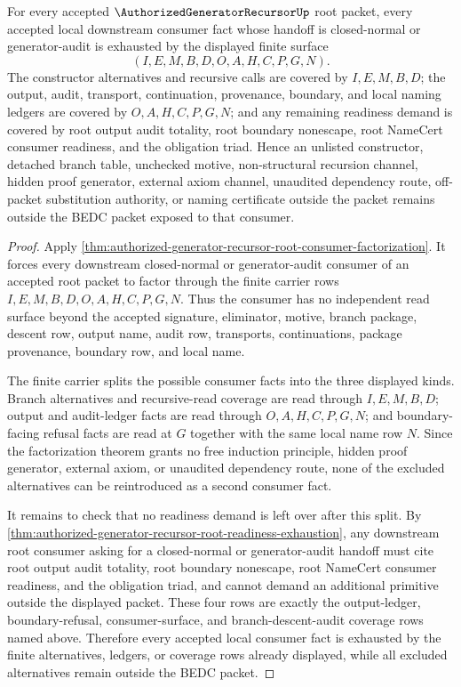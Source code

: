 \begin{theorem}
\label{thm:authorized-generator-recursor-root-consumer-fact-downstream-coverage}
For every accepted $\AuthorizedGeneratorRecursorUp$ root packet, every accepted local downstream consumer fact whose handoff is closed-normal or generator-audit is exhausted by the displayed finite surface
$$
(I,E,M,B,D,O,A,H,C,P,G,N).
$$
The constructor alternatives and recursive calls are covered by $I,E,M,B,D$; the output, audit, transport, continuation, provenance, boundary, and local naming ledgers are covered by $O,A,H,C,P,G,N$; and any remaining readiness demand is covered by root output audit totality, root boundary nonescape, root NameCert consumer readiness, and the obligation triad. Hence an unlisted constructor, detached branch table, unchecked motive, non-structural recursion channel, hidden proof generator, external axiom channel, unaudited dependency route, off-packet substitution authority, or naming certificate outside the packet remains outside the BEDC packet exposed to that consumer.
\end{theorem}
\begin{proof}
Apply \autoref{thm:authorized-generator-recursor-root-consumer-factorization}. It forces every downstream closed-normal or generator-audit consumer of an accepted root packet to factor through the finite carrier rows $I,E,M,B,D,O,A,H,C,P,G,N$. Thus the consumer has no independent read surface beyond the accepted signature, eliminator, motive, branch package, descent row, output name, audit row, transports, continuations, package provenance, boundary row, and local name.

The finite carrier splits the possible consumer facts into the three displayed kinds. Branch alternatives and recursive-read coverage are read through $I,E,M,B,D$; output and audit-ledger facts are read through $O,A,H,C,P,G,N$; and boundary-facing refusal facts are read at $G$ together with the same local name row $N$. Since the factorization theorem grants no free induction principle, hidden proof generator, external axiom, or unaudited dependency route, none of the excluded alternatives can be reintroduced as a second consumer fact.

It remains to check that no readiness demand is left over after this split. By \autoref{thm:authorized-generator-recursor-root-readiness-exhaustion}, any downstream root consumer asking for a closed-normal or generator-audit handoff must cite root output audit totality, root boundary nonescape, root NameCert consumer readiness, and the obligation triad, and cannot demand an additional primitive outside the displayed packet. These four rows are exactly the output-ledger, boundary-refusal, consumer-surface, and branch-descent-audit coverage rows named above. Therefore every accepted local consumer fact is exhausted by the finite alternatives, ledgers, or coverage rows already displayed, while all excluded alternatives remain outside the BEDC packet.
\end{proof}
